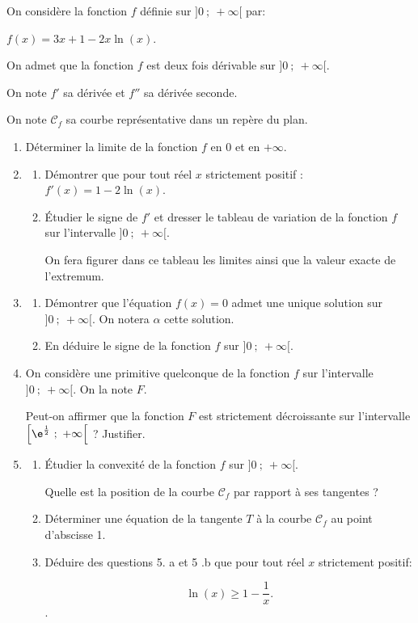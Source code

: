 \medskip

On considère la fonction $f$ définie sur $]0~;~+\infty[$ par:
\begin{center}\boldmath $f(x) = 3x + 1 - 2x \ln (x)$.\unboldmath\end{center}

On admet que la fonction $f$ est deux fois dérivable sur $]0~;~+\infty[$. 

On note $f'$ sa dérivée et $f''$ sa dérivée seconde.

On note $\mathcal{C}_f$ sa courbe représentative dans un repère du plan.

\medskip

\begin{enumerate}
\item Déterminer la limite de la fonction $f$ en 0 et en $+\infty$.
\item 
	\begin{enumerate}
		\item Démontrer que pour tout réel $x$ strictement positif : $f'(x) = 1- 2\ln (x)$.
		\item Étudier le signe de $f'$ et dresser le tableau de variation de la fonction $f$ sur l'intervalle $]0~;~+\infty[$.
		
On fera figurer dans ce tableau les limites ainsi que la valeur exacte de l'extremum.
	\end{enumerate}	
\item
	\begin{enumerate}
		\item Démontrer que l'équation $f(x) = 0$ admet une unique solution sur $]0~;~+\infty[$. On notera $\alpha$ cette solution.
		\item En déduire le signe de la fonction $f$ sur $]0~;~+\infty[$.
	\end{enumerate}	
\item On considère une primitive quelconque de la fonction $f$ sur
l'intervalle $]0~;~+\infty[$. On la note $F$.

Peut-on affirmer que la fonction $F$ est strictement décroissante sur l'intervalle $\left[\e^{\frac12}~;~+ \infty\right[$ ? Justifier.
\item
	\begin{enumerate}
		\item Étudier la convexité de la fonction $f$ sur $]0~;~+\infty[$.
		
Quelle est la position de la courbe $\mathcal{C}_f$ par rapport à ses tangentes ?
		\item Déterminer une équation de la tangente $T$ à la courbe $\mathcal{C}_f$ au point d'abscisse 1.
		\item Déduire des questions 5. a et 5 .b que pour tout réel $x$ strictement positif:

\[\ln (x) \geqslant  1 - \dfrac 1x.\].
	\end{enumerate}
\end{enumerate}

\bigskip
